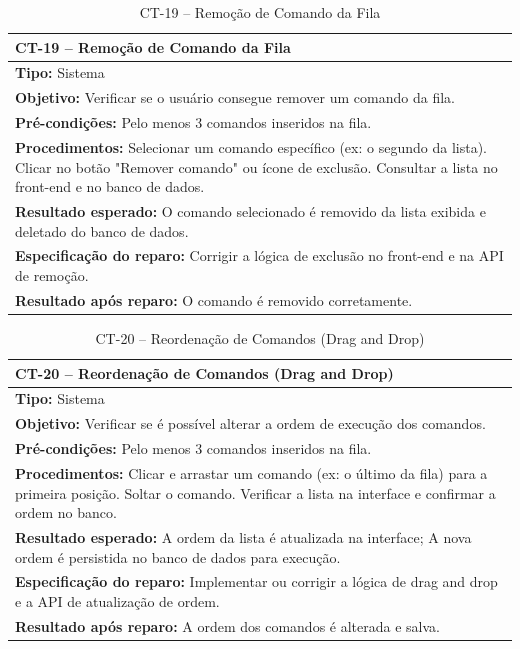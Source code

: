 
\begin{table}[H]
\centering
\begin{tabular}{|p{}|}
\hline
\textbf{CT-19 – Remoção de Comando da Fila} \\ \hline
\textbf{Tipo:} Sistema \\ \hline
\textbf{Objetivo:} Verificar se o usuário consegue remover um comando da fila. \\ \hline
\textbf{Pré-condições:} Pelo menos 3 comandos inseridos na fila. \\ \hline
\textbf{Procedimentos:} Selecionar um comando específico (ex: o segundo da lista). Clicar no botão "Remover comando" ou ícone de exclusão. Consultar a lista no front-end e no banco de dados. \\ \hline
\textbf{Resultado esperado:} O comando selecionado é removido da lista exibida e deletado do banco de dados. \\ \hline
\textbf{Especificação do reparo:} Corrigir a lógica de exclusão no front-end e na API de remoção. \\ \hline
\textbf{Resultado após reparo:} O comando é removido corretamente. \\ \hline
\end{tabular}
\caption{CT-19 – Remoção de Comando da Fila}
\end{table}


\begin{table}[H]
\centering
\begin{tabular}{|p{}|}
\hline
\textbf{CT-20 – Reordenação de Comandos (Drag and Drop)} \\ \hline
\textbf{Tipo:} Sistema \\ \hline
\textbf{Objetivo:} Verificar se é possível alterar a ordem de execução dos comandos. \\ \hline
\textbf{Pré-condições:} Pelo menos 3 comandos inseridos na fila. \\ \hline
\textbf{Procedimentos:} Clicar e arrastar um comando (ex: o último da fila) para a primeira posição. Soltar o comando. Verificar a lista na interface e confirmar a ordem no banco. \\ \hline
\textbf{Resultado esperado:} A ordem da lista é atualizada na interface; A nova ordem é persistida no banco de dados para execução. \\ \hline
\textbf{Especificação do reparo:} Implementar ou corrigir a lógica de drag and drop e a API de atualização de ordem. \\ \hline
\textbf{Resultado após reparo:} A ordem dos comandos é alterada e salva. \\ \hline
\end{tabular}
\caption{CT-20 – Reordenação de Comandos (Drag and Drop)}
\end{table}

